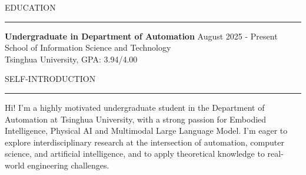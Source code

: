 \documentclass{resume} %
\renewenvironment{rSection}[1]{
\sectionskip
\textcolor{TsinghuaPurple}{\MakeUppercase{#1}}
\sectionlineskip
\hrule
\begin{list}{}{
\setlength{\leftmargin}{0em}
}
\item[]
}{
\end{list}
}
\begin{document}
  


\begin{rSection}{Education}

{\bf Undergraduate in Department of Automation} \hfill {August 2025 - Present}
\\ 
School of Information Science and Technology
\\
Tsinghua University,  GPA: 3.94/4.00   





\end{rSection} 


\begin{rSection}{Self-Introduction}

Hi! I'm a highly motivated undergraduate student in the Department of Automation at Tsinghua University,
with a strong passion for Embodied Intelligence, Physical AI and Multimodal Large Language Model.
I'm eager to explore interdisciplinary research at the intersection of automation, computer science, and
artificial intelligence, and to apply theoretical knowledge to real-world engineering challenges.

\end{rSection}

\end{document}
